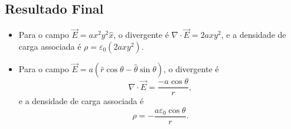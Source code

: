 \documentclass[a4paper,12pt]{article}
\newcommand{\printingbibliography}{%

    \pagestyle{myheadings}
    \markright{}
    \sloppy
    \printbibliography[heading=bibintoc, %
                   title=Refer\^encias %
                  ]
    \fussy%
}
\begin{document}
\begin{flushleft}
\section*{Resultado Final}

\begin{itemize}
\item Para o campo \( \vec{E} = a x^2 y^2 \hat{x} \), o divergente é \( \nabla \cdot \vec{E} = 2a x y^2 \), e a 
densidade de carga associada é \(\boxed{ \rho = \varepsilon_0 (2a x y^2) .}\)

\item Para o campo \( \vec{E} = a ( \hat{r} \cos \theta - \hat{\theta} \sin \theta ) \), o divergente 
é $$ \nabla \cdot \vec{E} = \frac{-a \cos \theta}{r},$$ e a densidade de carga associada 
é $$\boxed{ \rho = -\frac{a \varepsilon_0 \cos \theta}{r}.}$$
\end{itemize}

\end{flushleft}



\end{document}
